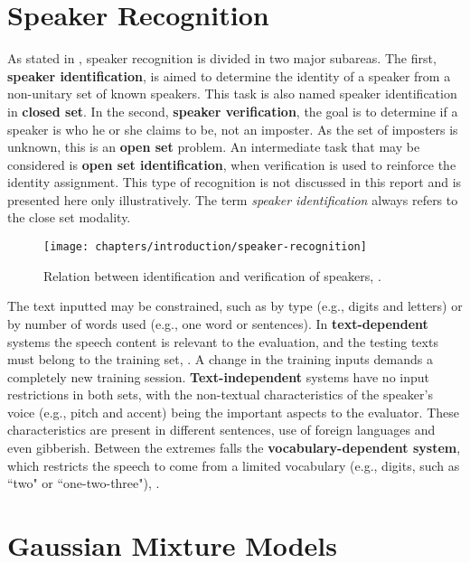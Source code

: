 \section{Speaker Recognition}
\label{sec:speaker-recognition}

As stated in , speaker recognition is divided in two major subareas. The first, \textbf{speaker identification}, is aimed to determine the identity of a speaker from a non-unitary set of known speakers. This task is also named speaker identification in \textbf{closed set}. In the second, \textbf{speaker verification}, the goal is to determine if a speaker is who he or she claims to be, not an imposter. As the set of imposters is unknown, this is an \textbf{open set} problem. An intermediate task that may be considered is \textbf{open set identification}, when verification is used to reinforce the identity assignment. This type of recognition is not discussed in this report and is presented here only illustratively. The term \emph{speaker identification} always refers to the close set modality.

\begin{figure}[ht]
    \centering
    \texttt{[image: chapters/introduction/speaker-recognition]}
    \caption{Relation between identification and verification of speakers, .}
    \label{fig:speaker-recognition}
\end{figure}

The text inputted may be constrained, such as by type (e.g., digits and letters) or by number of words used (e.g., one word or sentences). In \textbf{text-dependent} systems the speech content is relevant to the evaluation, and the testing texts must belong to the training set, . A change in the training inputs demands a completely new training session. \textbf{Text-independent} systems have no input restrictions in both sets, with the non-textual characteristics of the speaker's voice (e.g., pitch and accent) being the important aspects to the evaluator. These characteristics are present in different sentences, use of foreign languages and even gibberish. Between the extremes falls the \textbf{vocabulary-dependent system}, which restricts the speech to come from a limited vocabulary (e.g., digits, such as ``two" or ``one-two-three"), .

\section{Gaussian Mixture Models}
\label{sec:gmm}

